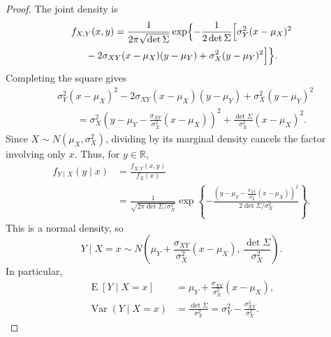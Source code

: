 \documentclass[11pt]{article}
\newcommand\E{\operatorname{E}}
\newcommand\Var{\operatorname{Var}}
\newcommand\R{\mathbb{R}}
\theoremstyle{definition}
\theoremstyle{remark}
\newenvironment{solution}{%
  \renewcommand{\proofname}{Solution}\begin{proof}%
}{\end{proof}}
\begin{document}
\begin{solution}
The joint density is
\begin{multline*}
 f_{X,Y}(x,y)=\frac{1}{2\pi\sqrt{\det\Sigma}}
 \exp\Bigl\{-\frac{1}{2\det\Sigma}\Bigl[
 \sigma_Y^2(x-\mu_X)^2\\
 {}-2\sigma_{XY}(x-\mu_X)(y-\mu_Y)
 +\sigma_X^2(y-\mu_Y)^2\Bigr]\Bigr\}.
\end{multline*}
Completing the square gives
\begin{align*}
 &\sigma_Y^2(x-\mu_X)^2-2\sigma_{XY}(x-\mu_X)(y-\mu_Y)
      +\sigma_X^2(y-\mu_Y)^2\\
 &\qquad=\sigma_X^2\left(y-\mu_Y-
          \frac{\sigma_{XY}}{\sigma_X^2}(x-\mu_X)\right)^2
          +\frac{\det\Sigma}{\sigma_X^2}(x-\mu_X)^2.
\end{align*}
Since $X\sim N(\mu_X,\sigma_X^2)$, dividing by its marginal density
cancels the factor involving only $x$. Thus, for $y\in\R$,
\begin{align*}
 f_{Y\mid X}(y\mid x)
 &=\frac{f_{X,Y}(x,y)}{f_X(x)}\\
 &=\frac{1}{\sqrt{2\pi\det\Sigma/\sigma_X^2}}
 \exp\left\{-\frac{
 \left(y-\mu_Y-\frac{\sigma_{XY}}{\sigma_X^2}(x-\mu_X)\right)^2
 }{2\det\Sigma/\sigma_X^2}\right\}.
\end{align*}
This is a normal density, so
\[
 Y\mid X=x\sim N\!\left(
 \mu_Y+\frac{\sigma_{XY}}{\sigma_X^2}(x-\mu_X),\,
 \frac{\det\Sigma}{\sigma_X^2}\right).
\]
In particular,
\begin{align*}
 \E[Y\mid X=x]&=\mu_Y+\frac{\sigma_{XY}}{\sigma_X^2}(x-\mu_X),\\
 \Var(Y\mid X=x)&=\frac{\det\Sigma}{\sigma_X^2}
 =\sigma_Y^2-\frac{\sigma_{XY}^2}{\sigma_X^2}.
\end{align*}
\end{solution}


\end{document}
